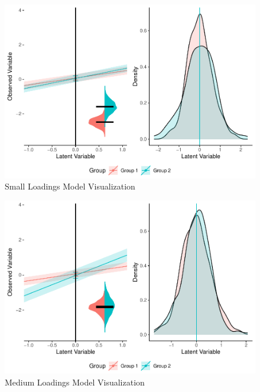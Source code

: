 \documentclass[
  man]{apa6}
\begin{document}
\begin{figure}
\centering
\includegraphics{manuscript_files/figure-latex/small-load-pic-1.pdf}
\caption{\label{fig:small-load-pic}Small Loadings Model Visualization}
\end{figure}

\begin{figure}
\centering
\includegraphics{manuscript_files/figure-latex/med-load-pic-1.pdf}
\caption{\label{fig:med-load-pic}Medium Loadings Model Visualization}
\end{figure}
\end{document}
